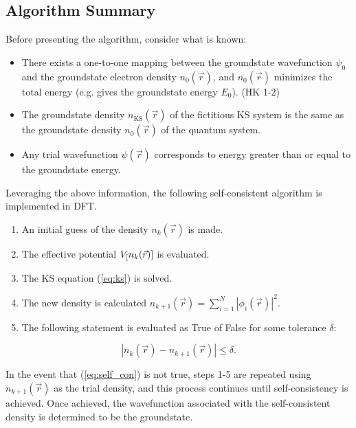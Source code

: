     \subsection{Algorithm Summary}
    
    Before presenting the algorithm, consider what is known:
    
    \begin{itemize}
        \item There exists a one-to-one mapping between the groundstate wavefunction $\psi_0$ and the groundstate electron density $n_0(\Vec{r})$, and $n_0(\Vec{r})$ minimizes the total energy (e.g. gives the groundstate energy $E_0$). (HK 1-2)
        \item The groundstate density $n_\text{KS}(\Vec{r})$ of the fictitious KS system is the same as the groundstate density $n_0(\Vec{r})$ of the quantum system. 
        \item Any trial wavefunction $\psi(\Vec{r})$ corresponds to energy greater than or equal to the groundstate energy.
    \end{itemize}
    
    \noindent Leveraging the above information, the following self-consistent algorithm is implemented in DFT.
    
    \begin{enumerate}
        \item An initial guess of the density $n_k(\Vec{r})$ is made.
        \item The effective potential $V_\text[n_k(\vec{r})]$ is evaluated.
        \item The KS equation (\ref{eq:ks}) is solved.
        \item The new density is calculated $n_{k+1}(\Vec{r}) = \sum\limits_{i=1}^N |\phi_i(\vec{r})|^2$.
        \item The following statement is evaluated as True of False for some tolerance $\delta$:
    \end{enumerate}
    
    \begin{equation}
    \label{eq:self_con}
        |n_{k}(\vec{r}) - n_{k+1}(\vec{r})| \le \delta.
    \end{equation}
    
    \noindent In the event that (\ref{eq:self_con}) is not true, steps 1-5 are repeated using $n_{k+1}(\Vec{r})$ as the trial density, and this process continues until self-consistency is achieved. Once achieved, the wavefunction associated with the self-consistent density is determined to be the groundstate.
    
